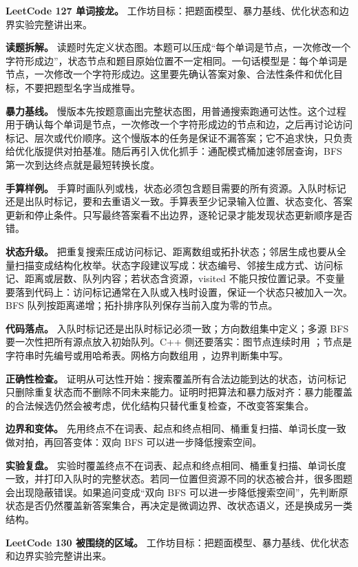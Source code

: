 \noindent\textbf{LeetCode 127 单词接龙。} 工作坊目标：把题面模型、暴力基线、优化状态和边界实验完整讲出来。

\textbf{读题拆解。} 读题时先定义状态图。本题可以压成“每个单词是节点，一次修改一个字符形成边”，状态节点和题目原始位置不一定相同。一句话模型是：每个单词是节点，一次修改一个字符形成边。这里要先确认答案对象、合法性条件和优化目标，不要把题型名字当成推导。

\textbf{暴力基线。} 慢版本先按题意画出完整状态图，用普通搜索跑通可达性。这个过程用于确认每个单词是节点，一次修改一个字符形成边的节点和边，之后再讨论访问标记、层次或代价顺序。这个慢版本的任务是保证不漏答案；它不追求快，只负责给优化版提供对拍基准。随后再引入优化抓手：通配模式桶加速邻居查询，BFS 第一次到达终点就是最短转换长度。

\textbf{手算样例。} 手算时画队列或栈，状态必须包含题目需要的所有资源。入队时标记还是出队时标记，要和去重语义一致。手算表至少记录输入位置、状态变化、答案更新和停止条件。只写最终答案看不出边界，逐轮记录才能发现状态更新顺序是否错。

\textbf{状态升级。} 把重复搜索压成访问标记、距离数组或拓扑状态；邻居生成也要从全量扫描变成结构化枚举。状态字段建议写成：状态编号、邻接生成方式、访问标记、距离或层数、队列内容；若状态含资源，visited 不能只按位置记录。不变量要落到代码上：访问标记通常在入队或入栈时设置，保证一个状态只被加入一次。BFS 队列按距离递增；拓扑排序队列保存当前入度为零的节点。

\textbf{代码落点。} 入队时标记还是出队时标记必须一致；方向数组集中定义；多源 BFS 要一次性把所有源点放入初始队列。C++ 侧还要落实：图节点连续时用 ；节点是字符串时先编号或用哈希表。网格方向数组用 ，边界判断集中写。

\textbf{正确性检查。} 证明从可达性开始：搜索覆盖所有合法边能到达的状态，访问标记只删除重复状态而不删除不同未来能力。证明时把算法和暴力版对齐：暴力能覆盖的合法候选仍然会被考虑，优化结构只替代重复检查，不改变答案集合。

\textbf{边界和变体。} 先用终点不在词表、起点和终点相同、桶重复扫描、单词长度一致做对拍，再回答变体：双向 BFS 可以进一步降低搜索空间。

\textbf{实验复盘。} 实验时覆盖终点不在词表、起点和终点相同、桶重复扫描、单词长度一致，并打印入队时的完整状态。若同一位置但资源不同的状态被合并，很多图题会出现隐蔽错误。如果追问变成“双向 BFS 可以进一步降低搜索空间”，先判断原状态是否仍然覆盖新答案集合，再决定是微调边界、改状态语义，还是换成另一类结构。

\noindent\textbf{LeetCode 130 被围绕的区域。} 工作坊目标：把题面模型、暴力基线、优化状态和边界实验完整讲出来。

